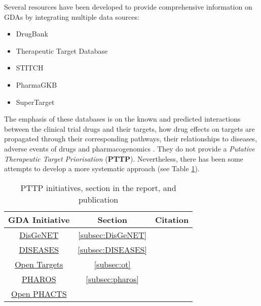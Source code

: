 Several resources have been developed to provide comprehensive information on GDAs by integrating multiple data sources:
\begin{itemize}
    \item DrugBank \cite{drugbank2008}
    \item Therapeutic Target Database \cite{ttd2018}
    \item STITCH \cite{stitch42014}
    \item PharmaGKB \cite{pharmaGSK2012}
    \item SuperTarget \cite{superTarget2012}
\end{itemize}

The emphasis of these databases is on the known and predicted interactions between the clinical trial drugs and their targets, how drug effects on targets are propagated through their corresponding pathways, their relationships to diseases, adverse events of drugs and pharmacogenomics \cite{brown2018}. They do not provide a \emph{Putative Therapeutic Target Priorisation} (\textbf{PTTP}). Nevertheless, there has been some attempts to develop a more systematic approach (see Table \ref{tab:related_work}).

\begin{table}[H]
\centering
    \begin{tabular}{c|c|c}
      GDA Initiative & Section & Citation \\
      \hline
      
      \href{https://goo.gl/ewnpWZ}{DisGeNET} & \ref{subsec:DisGeNET} & \cite{DisGeNET2015} \\
      
      \href{https://goo.gl/KGQsd9}{DISEASES} & \ref{subsec:DISEASES} & \cite{DISEASES2015} \\
      
      \href{https://goo.gl/eQ667p}{Open Targets} & \ref{subsec:ot} & \cite{koscielny2016} \\
      
      \href{https://goo.gl/dPWHNY}{PHAROS} &  \ref{subsec:pharos} & \cite{pharos2016} \\
      
      \href{https://goo.gl/edKMH7}{Open PHACTS} & & \\
      
      \end{tabular}
\caption{PTTP initiatives, section in the report, and publication \label{tab:related_work}}
\end{table}

\newpage


\newpage


\newpage


\newpage



